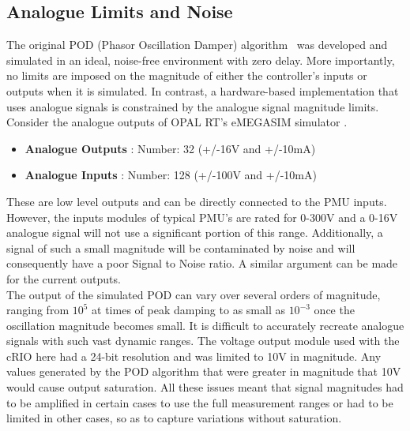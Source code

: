 \documentclass[journal]{IEEEtran}
\begin{document}

\subsection{Analogue Limits and Noise}
The original POD (Phasor Oscillation Damper) algorithm~\cite{PhasorPOD} was developed and simulated in an ideal, noise-free environment with zero delay. More importantly, no limits are imposed on the magnitude of either the controller's inputs or outputs when it is simulated. In contrast, a hardware-based implementation that uses analogue signals is constrained by the analogue signal magnitude limits.\\

Consider the analogue outputs of OPAL RT's eMEGASIM simulator \cite{OPALemegasim}.

\begin{itemize}
\item \textbf{Analogue Outputs} : Number: 32 (+/-16V and +/-10mA)
\item \textbf{Analogue Inputs} : Number: 128 (+/-100V and +/-10mA)
\end{itemize}

These are low level outputs and can be directly connected to the PMU inputs. However, the inputs modules of typical PMU's are rated for 0-300V and a 0-16V analogue signal will not use a significant portion of this range. Additionally, a signal of such a small magnitude will be contaminated by noise and will consequently have a poor Signal to Noise ratio. A similar argument can be made for the current outputs.\\

The output of the simulated POD can vary over several orders of magnitude, ranging from $10^{5}$ at times of peak damping to as small as $10^{-3}$ once the oscillation magnitude  becomes small. It is difficult to accurately recreate analogue signals with such vast dynamic ranges. The voltage output module used with the cRIO here had a 24-bit resolution and was limited to 10V in magnitude. Any values generated by the POD algorithm that were greater in magnitude that 10V would cause output saturation. All these issues meant that signal magnitudes had to be amplified in certain cases to use the full measurement ranges or had to be limited in other cases, so as to capture variations without saturation.\\
\end{document}

